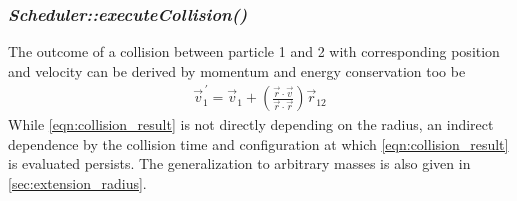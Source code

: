 \subsubsection{\quad \textit{Scheduler::executeCollision()}}
The outcome of a collision between particle 1 and 2 with corresponding position and velocity can be derived by momentum and energy conservation too be 
\begin{align}
\label{eqn:collision_result}
\vec{v}_1^{\,'} = \vec{v}_1 + \left( \frac{\vec{r} \cdot \vec{v} }{\vec{r} \cdot \vec{r}} \right) \vec{r}_{12}
\end{align}
While \autoref{eqn:collision_result} is not directly depending on the radius, an indirect dependence  by the collision time and configuration at which \autoref{eqn:collision_result} is evaluated persists. The generalization to arbitrary masses is also given in \autoref{sec:extension_radius}.
 
